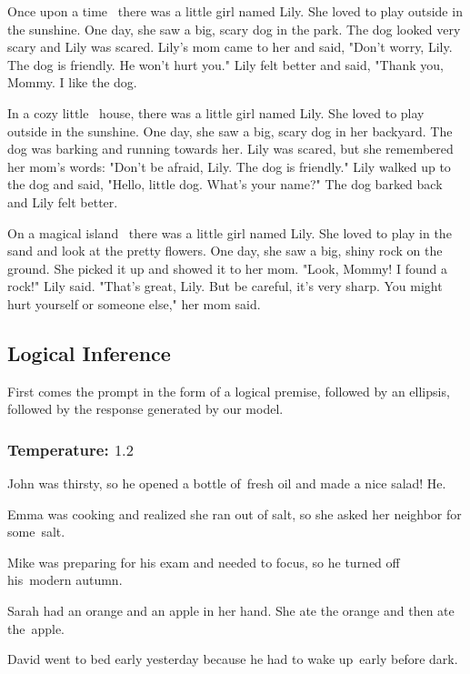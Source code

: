 \documentclass[11pt]{article}
\begin{document}
    Once upon a time \textellipsis\ there was a little girl named Lily. She loved to play outside in the sunshine. One day, she saw a big, scary dog in the park. The dog looked very scary and Lily was scared.  Lily's mom came to her and said, "Don't worry, Lily. The dog is friendly. He won't hurt you."  Lily felt better and said, "Thank you, Mommy. I like the dog.

    In a cozy little \textellipsis\ house, there was a little girl named Lily. She loved to play outside in the sunshine. One day, she saw a big, scary dog in her backyard. The dog was barking and running towards her. Lily was scared, but she remembered her mom's words: "Don't be afraid, Lily. The dog is friendly." Lily walked up to the dog and said, "Hello, little dog. What's your name?" The dog barked back and Lily felt better.

    On a magical island \textellipsis\ there was a little girl named Lily. She loved to play in the sand and look at the pretty flowers. One day, she saw a big, shiny rock on the ground. She picked it up and showed it to her mom. "Look, Mommy! I found a rock!" Lily said. "That's great, Lily. But be careful, it's very sharp. You might hurt yourself or someone else," her mom said.


    \subsection{Logical Inference}
    \label{logic}
    First comes the prompt in the form of a logical premise, followed by an ellipsis, followed by the response generated by our model.

    \subsubsection*{Temperature: $1.2$}

    John was thirsty, so he opened a bottle of\textellipsis\ fresh oil and made a nice salad! He.

    Emma was cooking and realized she ran out of salt, so she asked her neighbor for some\textellipsis\ salt.

    Mike was preparing for his exam and needed to focus, so he turned off his\textellipsis\ modern autumn.

    Sarah had an orange and an apple in her hand. She ate the orange and then ate the\textellipsis\ apple.

    David went to bed early yesterday because he had to wake up\textellipsis\ early before dark.
\end{document}

